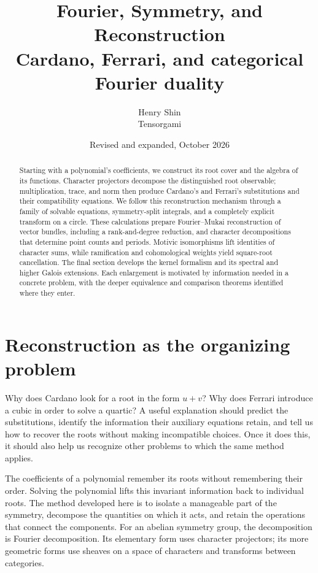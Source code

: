 \documentclass[11pt]{article}
\title{\textbf{Fourier, Symmetry, and Reconstruction}\\[6pt]\large Cardano, Ferrari, and categorical Fourier duality}
\author{Henry Shin\\\small Tensorgami}
\date{\small Revised and expanded, October 2026}
\theoremstyle{remark}
\begin{document}
\maketitle
\thispagestyle{empty}

\begin{abstract}
Starting with a polynomial's coefficients, we construct its root cover and the algebra of its functions. Character projectors decompose the distinguished root observable; multiplication, trace, and norm then produce Cardano's and Ferrari's substitutions and their compatibility equations. We follow this reconstruction mechanism through a family of solvable equations, symmetry-split integrals, and a completely explicit transform on a circle. These calculations prepare Fourier--Mukai reconstruction of vector bundles, including a rank-and-degree reduction, and character decompositions that determine point counts and periods. Motivic isomorphisms lift identities of character sums, while ramification and cohomological weights yield square-root cancellation. The final section develops the kernel formalism and its spectral and higher Galois extensions. Each enlargement is motivated by information needed in a concrete problem, with the deeper equivalence and comparison theorems identified where they enter.
\end{abstract}

\clearpage
\begingroup
\setlength{\parskip}{0pt}
\fontsize{10}{12}\selectfont
\tableofcontents
\endgroup
\clearpage


\section{Reconstruction as the organizing problem}
\label{sec:reconstruction}

Why does Cardano look for a root in the form \(u+v\)? Why does Ferrari introduce a cubic in order to solve a quartic? A useful explanation should predict the substitutions, identify the information their auxiliary equations retain, and tell us how to recover the roots without making incompatible choices. Once it does this, it should also help us recognize other problems to which the same method applies.

The coefficients of a polynomial remember its roots without remembering their order. Solving the polynomial lifts this invariant information back to individual roots. The method developed here is to isolate a manageable part of the symmetry, decompose the quantities on which it acts, and retain the operations that connect the components. For an abelian symmetry group, the decomposition is Fourier decomposition. Its elementary form uses character projectors; its more geometric forms use sheaves on a space of characters and transforms between categories.
\end{document}
